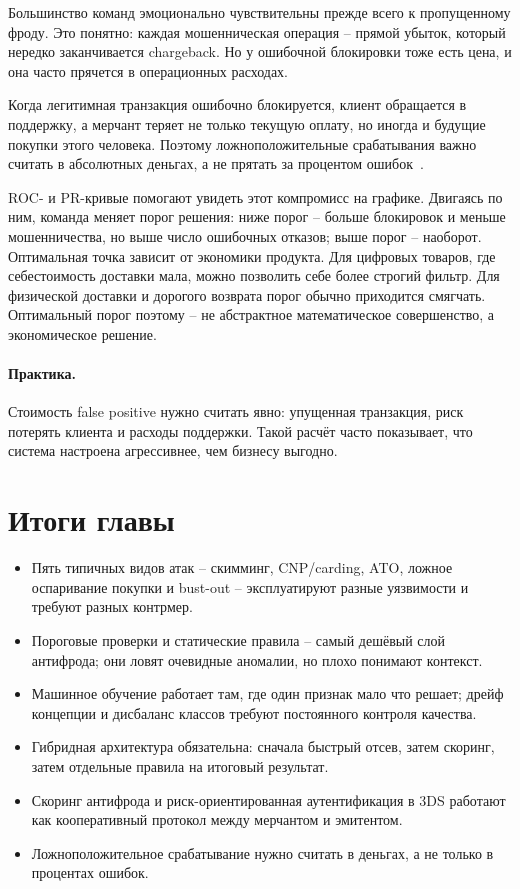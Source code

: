 Большинство команд эмоционально чувствительны прежде всего к
пропущенному фроду. Это понятно: каждая мошенническая операция --
прямой убыток, который нередко заканчивается chargeback. Но у
ошибочной блокировки тоже есть цена, и она часто прячется в
операционных расходах.

Когда легитимная транзакция ошибочно блокируется, клиент обращается
в поддержку, а мерчант теряет не только текущую оплату, но иногда и
будущие покупки этого человека. Поэтому ложноположительные
срабатывания важно считать в абсолютных деньгах, а не прятать за
процентом ошибок~\cite{visa-auth-management-2020}.

ROC- и PR-кривые помогают увидеть этот компромисс на графике.
Двигаясь по ним, команда меняет порог решения: ниже порог -- больше
блокировок и меньше мошенничества, но выше число ошибочных отказов;
выше порог -- наоборот. Оптимальная точка зависит от экономики
продукта. Для цифровых товаров, где себестоимость доставки мала,
можно позволить себе более строгий фильтр. Для физической доставки
и дорогого возврата порог обычно приходится смягчать. Оптимальный
порог поэтому -- не абстрактное математическое совершенство, а
экономическое решение.

\paragraph{Практика.}
Стоимость false positive нужно считать явно: упущенная транзакция, риск потерять клиента и расходы поддержки. Такой расчёт часто показывает, что система настроена агрессивнее, чем бизнесу выгодно.


\section*{Итоги главы}
\begin{itemize}
  \item Пять типичных видов атак -- скимминг, CNP/carding, ATO,
        ложное оспаривание покупки и bust-out -- эксплуатируют разные
        уязвимости и требуют разных контрмер.
  \item Пороговые проверки и статические правила -- самый дешёвый слой
        антифрода; они ловят очевидные аномалии, но плохо понимают контекст.
  \item Машинное обучение работает там, где один признак мало что
        решает; дрейф концепции и дисбаланс классов требуют постоянного
        контроля качества.
  \item Гибридная архитектура обязательна: сначала быстрый отсев,
        затем скоринг, затем отдельные правила на итоговый результат.
  \item Скоринг антифрода и риск-ориентированная аутентификация в 3DS
        работают как кооперативный протокол между мерчантом и эмитентом.
  \item Ложноположительное срабатывание нужно считать в деньгах,
        а не только в процентах ошибок.
\end{itemize}

